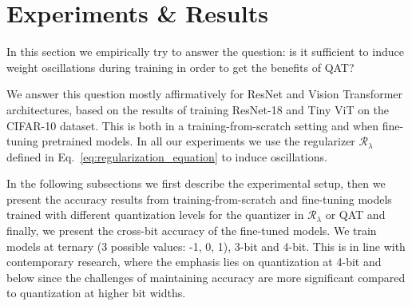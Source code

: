 
\section{Experiments \& Results}\label{sec:experiments}
In this section we empirically try to answer the question: is it sufficient to induce weight oscillations during training in order to get the benefits of QAT?

We answer this question mostly affirmatively for ResNet and Vision Transformer architectures, based on the results of training ResNet-18 and Tiny ViT on the CIFAR-10 dataset. This is both in a training-from-scratch setting and when fine-tuning pretrained models. In all our experiments we use the regularizer $\mathcal{R}_\lambda$ defined in Eq.~\eqref{eq:regularization_equation} to induce oscillations.



In the following subsections we first describe the experimental setup, then we present the accuracy results from training-from-scratch and fine-tuning models trained with different quantization levels for the quantizer in $\mathcal{R}_\lambda$ or QAT and finally, we present the cross-bit accuracy of the fine-tuned models.
We train models at ternary (3 possible values: -1, 0, 1), 3-bit and 4-bit. This is in line with contemporary research, where the emphasis lies on quantization at 4-bit and below since the challenges of maintaining accuracy are more significant compared to quantization at higher bit widths.


